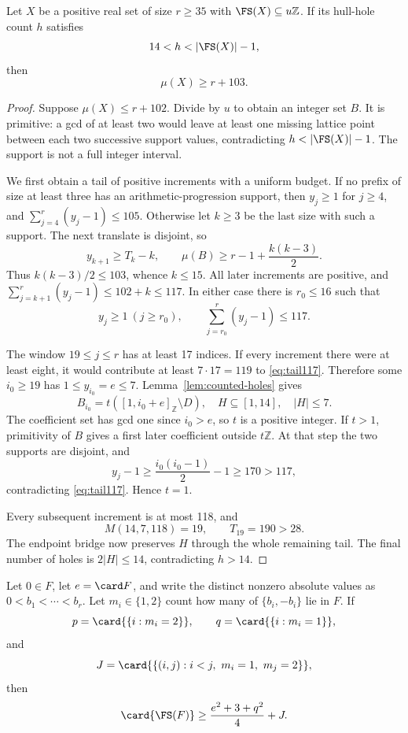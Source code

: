 \begin{theorem}\label{thm:holes103}
Let $X$ be a positive real set of size $r\geq35$ with
$\FS(X)\subseteq u\mathbb Z$. If its hull-hole count $h$ satisfies
\[
14<h<|\FS(X)|-1,
\]
then
\[
\boxed{\mu(X)\geq r+103.}
\]
\end{theorem}
\begin{proof}
Suppose $\mu(X)\leq r+102$. Divide by $u$ to obtain an integer set $B$.
It is primitive: a gcd of at least two would leave at least one missing
lattice point between each two successive support values, contradicting
$h<|\FS(X)|-1$. The support is not a full integer interval.

We first obtain a tail of positive increments with a uniform budget.
If no prefix of size at least three has an arithmetic-progression support,
then $y_j\geq1$ for $j\geq4$, and
$\sum_{j=4}^r(y_j-1)\leq105$.
Otherwise let $k\geq3$ be the last size with such a support. The next
translate is disjoint, so
\[
y_{k+1}\geq T_k-k,
\qquad
\mu(B)\geq r-1+\frac{k(k-3)}2.
\]
Thus $k(k-3)/2\leq103$, whence $k\leq15$. All later increments are
positive, and
$\sum_{j=k+1}^r(y_j-1)\leq102+k\leq117$.
In either case there is $r_0\leq16$ such that
\begin{equation}
y_j\geq1\ (j\geq r_0),\qquad
\sum_{j=r_0}^r(y_j-1)\leq117.\label{eq:tail117}
\end{equation}


The window $19\leq j\leq r$ has at least 17 indices. If every increment
there were at least eight, it would contribute at least $7\cdot17=119$
to \eqref{eq:tail117}. Therefore some $i_0\geq19$ has $1\leq y_{i_0}=e\leq7$.
Lemma~\ref{lem:counted-holes} gives
\[
B_{i_0}=t([1,i_0+e]_{\mathbb Z}\setminus D),\quad
H\subseteq[1,14],\quad |H|\leq7.
\]
The coefficient set has gcd one since $i_0>e$, so $t$ is a positive integer.
If $t>1$, primitivity of $B$ gives a first later coefficient outside
$t\mathbb Z$. At that step the two supports are disjoint, and
\[
y_j-1\geq\frac{i_0(i_0-1)}2-1\geq170>117,
\]
contradicting \eqref{eq:tail117}. Hence $t=1$.

Every subsequent increment is at most 118, and
\[
M(14,7,118)=19,\qquad T_{19}=190>28.
\]
The endpoint bridge now preserves $H$ through the whole remaining tail.
The final number of holes is $2|H|\leq14$, contradicting $h>14$.
\end{proof}


\begin{lemma}\label{lem:unpaired}
Let $0\in F$, let $e=\card F$, and write the distinct nonzero absolute values
as $0<b_1<\cdots<b_r$.  Let $m_i\in\{1,2\}$ count how many of
$\{b_i,-b_i\}$ lie in $F$.  If
\[
 p=\card{\{i:m_i=2\}},\qquad q=\card{\{i:m_i=1\}},
\]
and
\[
 J=\card{\{(i,j):i<j,\ m_i=1,\ m_j=2\}},
\]
then
\begin{equation}
 \card{\FS(F)}\geq\frac{e^2+3+q^2}{4}+J.
 \label{eq:unpaired}
\end{equation}
\end{lemma}

